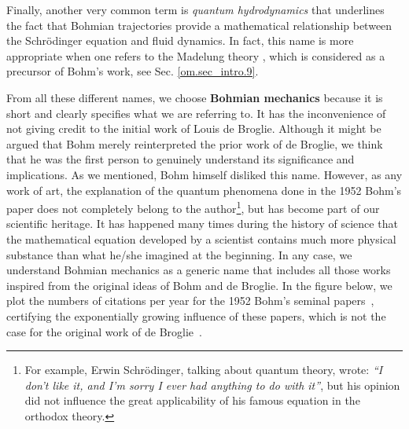 \documentclass[nofootinbib, secnumarabic, amsmath, nobibnotes,10pt,aps,pra]{revtex4-1}
\newcommand{\sref}[1]{Sec. \ref{#1}}
\begin{document}
Finally, another very common term is \emph{quantum hydrodynamics} \cite{om.wyatt2005} that underlines the fact that Bohmian trajectories provide a mathematical relationship between the Schr\"odinger equation and fluid dynamics. In fact, this name is more appropriate when one refers to the Madelung theory \cite{om.Madelung}, which is considered as a precursor of Bohm's work, see \sref{om.sec_intro.9}.

From all these different names, we choose \textbf{Bohmian mechanics} because it is short and clearly specifies what we are referring to. It has the inconvenience of not giving credit to the initial work of Louis de Broglie.
Although it might be argued that Bohm merely reinterpreted the prior work of de Broglie, we think that he was the first person to genuinely understand its significance and implications. As we mentioned, Bohm himself disliked this name. However, as any work of art, the explanation of the quantum phenomena done in the 1952 Bohm's paper does not completely belong to the author\footnote{For example, Erwin Schr\"odinger, talking about quantum theory, wrote: \emph{``I don't like it, and I'm sorry I ever had anything to do with it''}, but his opinion did not influence the great applicability of his famous equation in the orthodox theory.}, but has become part of our scientific heritage. It has happened many times during the history of science that the mathematical equation developed by a scientist contains much more physical substance than what he/she imagined at the beginning. 
In any case, we understand Bohmian mechanics as a generic name that includes all those works inspired from the original ideas of Bohm and de Broglie. In the figure below, we plot the numbers of citations per year for the 1952 Bohm's seminal papers~\cite{om.bohm1952a,om.bohm1952b}, certifying the exponentially growing influence of these papers, which is not the case for the original work of de Broglie~\cite{om.debroglie1927b}.
\end{document}

